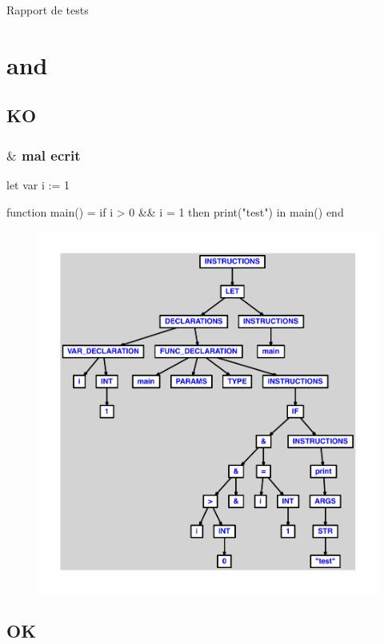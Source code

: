 \documentclass{article}
\begin{document}
{\thispagestyle{empty}}
\begin{center}
\vspace*{\fill}
{\Huge{Rapport de tests}}
\vspace*{\fill}
\end{center}
\newpage
{}
\tableofcontents
\newpage
{}
\section{and}
\subsection{KO}
\subsubsection{$ \& $ mal ecrit}
\begin{verbatimtab}
let
	var i := 1

	function main() =
		if i > 0 && i = 1 then print("test")
in main() end
\end{verbatimtab}
\begin{figure}[H]\centering\includegraphics[max width=\textwidth]{ast/ast_0.pdf}\end{figure}\subsection{OK}
\end{document}

